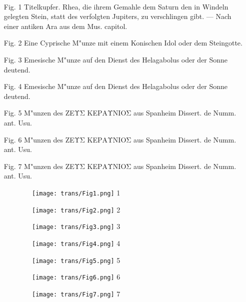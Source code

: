 \documentclass[a4paper, 11pt, oneside, polutonikogreek, german]{article}
\begin{document}
\paragraph{}
\begin{enumerate}
    \item[Fig. 1] Titelkupfer. Rhea, die ihrem Gemahle dem Saturn den in Windeln gelegten Stein, statt des verfolgten Jupiters, zu verschlingen gibt. --- Nach einer antiken Ara aus dem Mus. capitol.
    \item[Fig. 2] Eine Cyprische M"unze mit einem Konischen Idol oder dem Steingotte.
    \item[Fig. 3] Emesische M"unze auf den Dienst des Helagabolus oder der Sonne deutend.
    \item[Fig. 4] Emesische M"unze auf den Dienst des Helagabolus oder der Sonne deutend.
    \item[Fig. 5] M"unzen des ΖΕΥΣ ΚΕΡΑΥΝΙΟΣ aus Spanheim Dissert. de Numm. ant. Usu.
    \item[Fig. 6] M"unzen des ΖΕΥΣ ΚΕΡΑΥΝΙΟΣ aus Spanheim Dissert. de Numm. ant. Usu.
    \item[Fig. 7] M"unzen des ΖΕΥΣ ΚΕΡΑΥΝΙΟΣ aus Spanheim Dissert. de Numm. ant. Usu.
\end{enumerate}
\clearpage
\pagestyle{fancy}
\fancyhf{}
\rhead{}
\cfoot{\thepage}

\begin{figure}[ht]

\begin{subfigure}{0.5\textwidth}
\texttt{[image: trans/Fig1.png]} 1
\end{subfigure}
\begin{subfigure}{0.5\textwidth}
\texttt{[image: trans/Fig2.png]} 2
\end{subfigure}
\begin{subfigure}{0.5\textwidth}
\texttt{[image: trans/Fig3.png]} 3
\end{subfigure}
\begin{subfigure}{0.5\textwidth}
\texttt{[image: trans/Fig4.png]} 4
\end{subfigure}
\begin{subfigure}{0.5\textwidth}
\texttt{[image: trans/Fig5.png]} 5
\end{subfigure}
\begin{subfigure}{0.5\textwidth}
\texttt{[image: trans/Fig6.png]} 6
\end{subfigure}
\begin{subfigure}{0.5\textwidth}
\texttt{[image: trans/Fig7.png]} 7
\end{subfigure}

\end{figure}
\clearpage
\end{document}

